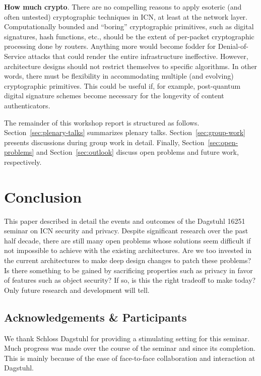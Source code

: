 \documentclass{sig-alternate-10pt}
\begin{document}
\noindent
{\bf How much crypto}. There are no compelling reasons to apply esoteric (and often untested)
cryptographic techniques in ICN, at least at the network layer. Computationally bounded
and ``boring'' cryptographic primitives, such as digital signatures, hash functions, etc.,
should be the extent of per-packet cryptographic processing done by routers. Anything
more would become fodder for Denial-of-Service attacks that could render the entire
infrastructure ineffective. However, architecture designs should not restrict themselves
to specific algorithms. In other words, there must be flexibility in accommodating
multiple (and evolving) cryptographic primitives. This could be useful if, for example,
post-quantum digital signature schemes become necessary for the longevity of content authenticators.

The remainder of this workshop report is structured as follows.
Section~\ref{sec:plenary-talks} summarizes plenary talks.
Section~\ref{sec:group-work} presents discussions during group work in detail.
Finally, Section~\ref{sec:open-problems} and Section~\ref{sec:outlook} discuss open problems and future work, respectively.






\section{Conclusion}
This paper described in detail the events and outcomes of the Dagstuhl 16251
seminar on ICN security and privacy. Despite significant research over the past
half decade, there are still many open problems whose solutions seem difficult
if not impossible to achieve with the existing architectures. Are we too invested
in the current architectures to make deep design changes to patch these problems?
Is there something to be gained by sacrificing properties such as privacy in favor
of features such as object security? If so, is this the right tradeoff to make
today? Only future research and development will tell.

\subsection*{Acknowledgements \& Participants}
We thank Schloss Dagstuhl for providing a stimulating setting for this seminar. Much
progress was made over the course of the seminar and since its completion. This is mainly
because of the ease of face-to-face collaboration and interaction at Dagstuhl.
\end{document}
